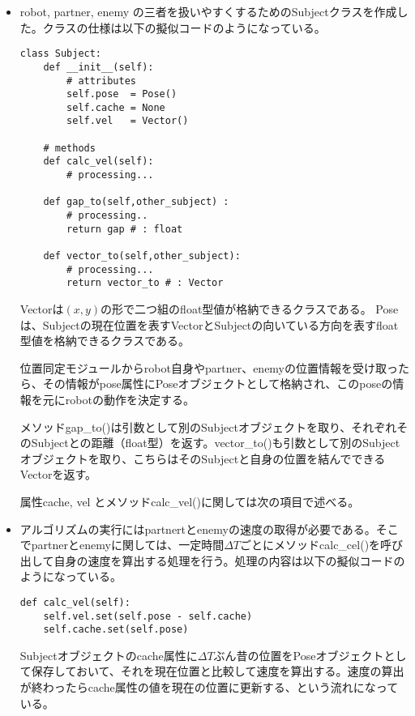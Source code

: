 \documentclass{kuisthesis}
\begin{document}
\begin{itemize}
\item robot, partner, enemy の三者を扱いやすくするためのSubjectクラスを作成した。クラスの仕様は以下の擬似コードのようになっている。

\begin{lstlisting}
class Subject:
	def __init__(self):
		# attributes
		self.pose  = Pose()
		self.cache = None
		self.vel   = Vector()

	# methods
	def calc_vel(self):
		# processing...

	def gap_to(self,other_subject) :
		# processing..
		return gap # : float

	def vector_to(self,other_subject):
		# processing...
		return vector_to # : Vector
\end{lstlisting}

Vectorは$(x,y)$の形で二つ組のfloat型値が格納できるクラスである。
Poseは、Subjectの現在位置を表すVectorとSubjectの向いている方向を表すfloat型値を格納できるクラスである。

位置同定モジュールからrobot自身やpartner、enemyの位置情報を受け取ったら、その情報がpose属性にPoseオブジェクトとして格納され、このposeの情報を元にrobotの動作を決定する。

メソッドgap\_to()は引数として別のSubjectオブジェクトを取り、それぞれそのSubjectとの距離（float型）を返す。vector\_to()も引数として別のSubjectオブジェクトを取り、こちらはそのSubjectと自身の位置を結んでできるVectorを返す。

属性cache, vel とメソッドcalc\_vel()に関しては次の項目で述べる。

\vspace{1.0em}

\item アルゴリズムの実行にはpartnertとenemyの速度の取得が必要である。そこでpartnerとenemyに関しては、一定時間$\Delta T$ごとにメソッドcalc\_cel()を呼び出して自身の速度を算出する処理を行う。処理の内容は以下の擬似コードのようになっている。

\begin{lstlisting}
def calc_vel(self):
	self.vel.set(self.pose - self.cache)
	self.cache.set(self.pose)
\end{lstlisting}

Subjectオブジェクトのcache属性に$\Delta T$ぶん昔の位置をPoseオブジェクトとして保存しておいて、それを現在位置と比較して速度を算出する。速度の算出が終わったらcache属性の値を現在の位置に更新する、という流れになっている。

\vspace{1.0em}


\end{itemize}
\end{document}
